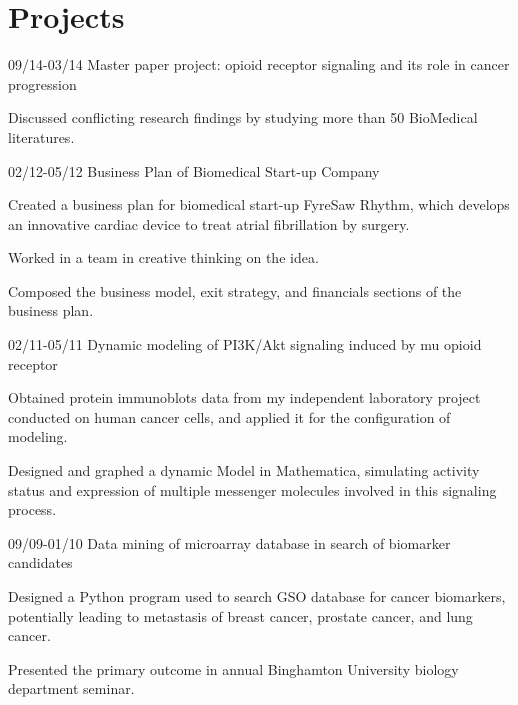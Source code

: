 \documentclass[]{friggeri-cv}
\begin{document}
\section{Projects}
\begin{entrylist}
	\entry
		{09/14-03/14}
		{Master paper project: opioid receptor signaling and its role in cancer
			progression}
		{}
		{
			\begin{tightemize}
				\item{Discussed conflicting research findings by studying more than 50 BioMedical
					literatures.}
			\end{tightemize}
		}
	\entry
		{02/12-05/12}
		{Business Plan of Biomedical Start-up Company}
		{}
		{
			\begin{tightemize}
				\item{Created a business plan for biomedical start-up FyreSaw
					Rhythm, which develops an innovative cardiac device to treat atrial
					fibrillation by surgery.}
				\item{Worked in a team in creative thinking on the idea.}
				\item{Composed the business model, exit strategy, and financials
					sections of the business plan.}
			\end{tightemize}
		}
	\entry
		{02/11-05/11}
		{Dynamic modeling of PI3K/Akt signaling induced by mu opioid receptor}
		{}
		{
			\begin{tightemize}
				\item{Obtained protein immunoblots data from my independent laboratory project
					conducted on human cancer cells, and applied it for the configuration of
					modeling.}
				\item{Designed and graphed a dynamic Model in Mathematica, simulating activity
					status and expression of multiple messenger molecules involved in this
					signaling process.}
			\end{tightemize}
		}
	\entry
		{09/09-01/10}
		{Data mining of microarray database in search of biomarker candidates}
		{}
		{
			\begin{tightemize}
				\item{Designed a Python program used to search GSO database for cancer
					biomarkers, potentially leading to metastasis of breast cancer, prostate
					cancer, and lung cancer.}
				\item{Presented the primary outcome in annual Binghamton University biology
					department seminar.}
			\end{tightemize}
		}
\end{entrylist}
\end{document}
